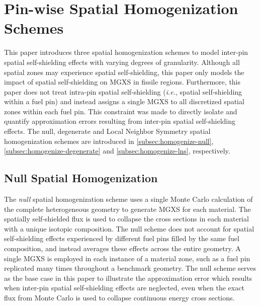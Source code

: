 \section{Pin-wise Spatial Homogenization Schemes}
\label{sec:pin-wise-shielding}

This paper introduces three spatial homogenization schemes to model inter-pin spatial self-shielding effects with varying degrees of granularity. Although all spatial zones may experience spatial self-shielding, this paper only models the impact of spatial self-shielding on MGXS in fissile regions. Furthermore, this paper does not treat intra-pin spatial self-shielding (\textit{i.e.}, spatial self-shielding within a fuel pin) and instead assigns a single MGXS to all discretized spatial zones within each fuel pin. This constraint was made to directly isolate and quantify approximation errors resulting from inter-pin spatial self-shielding effects. The null, degenerate and Local Neighbor Symmetry spatial homogenization schemes are introduced in \autoref{subsec:homogenize-null}, \autoref{subsec:homogenize-degenerate} and \autoref{subsec:homogenize-lns}, respectively.


\subsection{Null Spatial Homogenization}
\label{subsec:homogenize-null}

The \textit{null} spatial homogenization scheme uses a single Monte Carlo calculation of the complete heterogeneous geometry to generate MGXS for each material. The spatially self-shielded flux is used to collapse the cross sections in each material with a unique isotopic composition. The null scheme does not account for spatial self-shielding effects experienced by different fuel pins filled by the same fuel composition, and instead averages these effects across the entire geometry. A single MGXS is employed in each instance of a material zone, such as a fuel pin replicated many times throughout a benchmark geometry. The null scheme serves as the base case in this paper to illustrate the approximation error which results when inter-pin spatial self-shielding effects are neglected, even when the exact flux from Monte Carlo is used to collapse continuous energy cross sections.



